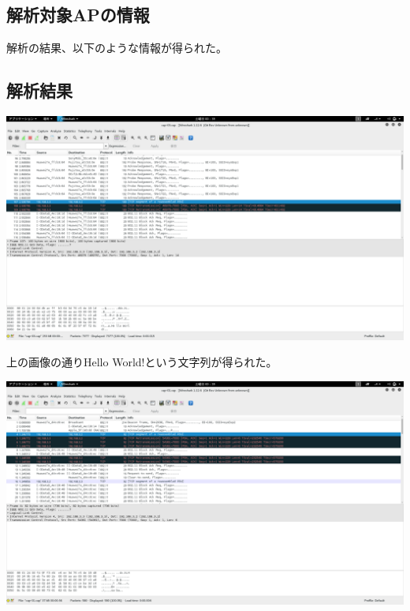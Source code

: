 \documentclass[a4j]{celb-report}
\begin{document}
\subsection{解析対象APの情報}
解析の結果、以下のような情報が得られた。



\subsection{解析結果}
\begin{center}
 \includegraphics[width=17cm]{../LAN1/sysExp1/Screenshot.png}
\end{center}
上の画像の通りHello World!という文字列が得られた。
\begin{center}
 \includegraphics[width=17cm]{../LAN1/sysExp2/Screenshot.png}
\end{center}
\end{document}
